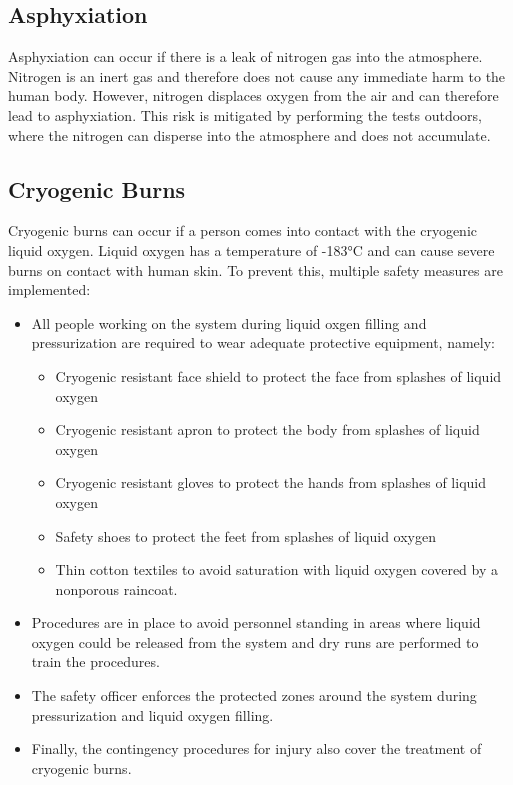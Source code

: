 \documentclass{article}
\begin{document}
\subsection{Asphyxiation}
Asphyxiation can occur if there is a leak of nitrogen gas into the atmosphere. Nitrogen is an inert gas and therefore does not cause any immediate harm to the human body. However, nitrogen displaces oxygen from the air and can therefore lead to asphyxiation. This risk is mitigated by performing the tests outdoors, where the nitrogen can disperse into the atmosphere and does not accumulate.
\subsection{Cryogenic Burns}
Cryogenic burns can occur if a person comes into contact with the cryogenic liquid oxygen. Liquid oxygen has a temperature of -183°C and can cause severe burns on contact with human skin. To prevent this, multiple safety measures are implemented:
\begin{itemize}
    \item All people working on the system during liquid oxgen filling and pressurization are required to wear adequate protective equipment, namely:
    \begin{itemize}
        \item Cryogenic resistant face shield to protect the face from splashes of liquid oxygen
        \item Cryogenic resistant apron to protect the body from splashes of liquid oxygen
        \item Cryogenic resistant gloves to protect the hands from splashes of liquid oxygen
        \item Safety shoes to protect the feet from splashes of liquid oxygen
        \item Thin cotton textiles to avoid saturation with liquid oxygen covered by a nonporous raincoat.
    \end{itemize}
    \item Procedures are in place to avoid personnel standing in areas where liquid oxygen could be released from the system and dry runs are performed to train the procedures.
    \item The safety officer enforces the protected zones around the system during pressurization and liquid oxygen filling.
    \item Finally, the contingency procedures for injury also cover the treatment of cryogenic burns.
\end{itemize}
\end{document}

